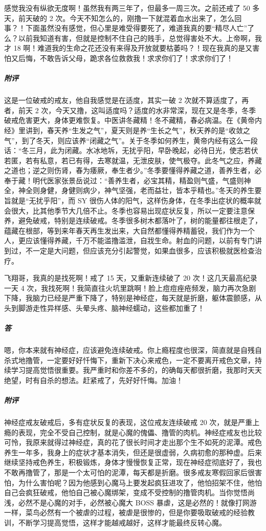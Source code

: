 \begin{case}
    感觉我没有纵欲无度啊！虽然我有两三年了，但最多一周三次。之前还戒了 50 多天，前天破的 2 次。今天不知怎么的，刚撸一下就混着血水出来了，怎么回事？！下面虽然没有感觉，但心里是难受得要死了，难道我真的要“精尽人亡”了么？以前我知道有害，但就是控制不住自己的贱手，总觉得害处不大。上帝啊，我才 18 啊！难道我的生命之花还没有来得及开放就要枯萎吗？！现在我真的是又害怕又后悔，不敢告诉父母，跪求各位救救我！求求你们了！求求你们了！
    \subparagraph{附评} 这是一位破戒的戒友，他自我感觉是在适度，其实一破 2 次就不算适度了，再者，前天 2 次，今天又撸，这叫适度吗？适度的水非常深，现在又是冬季，冬季破戒危害更大，身体更难恢复。中医讲冬藏精！冬不藏精，春必病温。在《黄帝内经》里讲到，春天养“生发之气”，夏天则是养“生长之气”，秋天养的是“收敛之气”，到了冬天，则应该养“闭藏之气”。关于冬季如何养生，黄帝内经有这么一段话：“冬三月，此为闭藏。水冰地坼，无扰乎阳，早卧晚起，必待日光，使志若伏若匿，若有私意，若已有得，去寒就温，无泄皮肤，使气极夺。此冬气之应，养藏之道也；逆之则伤肾，春为痿厥，奉生者少。”冬季要懂得养藏之道，善养生者，必奉于藏！明代医家张景岳说过：“善养生者，必宝其精，精盈则气盛，气盛则神全，神全则身健，身健则病少，神气坚强，老而益壮，皆本乎精也。”冬天的养生要旨就是“无扰乎阳”，而 SY 很伤人体的阳气，这样伤身体，在冬季出症状的概率就会很大，比其他季节大几倍不止。冬季也容易出现症状反复，所以一定要注意保养，避免破戒，特别是连续破戒。冬季很多树木都落叶了，树的能量都往根走了，蕴藏在根部，等到来年春天再生发出来，大自然都懂得养精蓄锐，我们作为一个人，更应该懂得养藏，千万不能滥撸滥泄，自戕生命。射血的问题，以前有专门讲到过，不一定是大问题，但应该充分引起警觉，如果血很多，应该积极就医检查治疗。
\end{case}

\begin{case}
    飞翔哥，我真的是找死啊！戒了 15 天，又重新连续破了 20 次！这几天最高纪录一天 4 次，我找死啊！我简直往火坑里跳啊！脸上痘痘痤疮频发，脑力再次急剧下降，我脑力已经是严重下降了，特别是神经症，每天就是折磨，躯体震颤感，从头到脚游走性异样感、头晕头疼、脑神经蠕动，这些都加重了！
    \subparagraph{答} 嗯，你本来就有神经症，应该避免连续破戒。你上瘾程度也很深，简直就是自残自杀式地撸管，一定要好好忏悔下，重新下决心来戒色，一定不要离开戒色文章，持续学习提高觉悟很重要。我严重时和你差不多的，的确每天都很折磨，我那时天天绝望，时有自杀的想法。赶紧戒了，先好好忏悔。加油！
    \subparagraph{附评} 神经症戒友破戒后，多有症状反复的表现，这位戒友连续破戒 20 次，就是严重上瘾的表现，完全不受自己控制，就是心魔的傀儡、撸管的肉机。神经症戒友也比较可怜，我原来就得过神经症，真的花了很长时间才走出那个生不如死的泥潭。戒色养生一年多，我身上的症状才基本消失，但还是很虚弱，久病初愈的那种虚。后来继续坚持戒色养生，积极锻炼，身体才慢慢恢复正常，现在神经症彻底好了，我也不敢再撸管了，那是一个太可怕的泥潭，每天都是折磨。很多戒友寒假回家后很害怕，为什么害怕呢？因为他感到心魔马上要发起疯狂进攻了，他怕招架不住，他怕自己会疯狂破戒，他怕自己被心魔绑架，变成不受控制的撸管肉机。当你觉悟尚浅，必然不是心魔的对手，必然被心魔大 BOSS 暴虐，这是必然的！就像打网游一样，菜鸟必然有一个被虐的过程，被虐是很惨的，但是你要吸取破戒的经验教训，不断学习提高觉悟，这样才能越戒越好，这样才能最终反转心魔。
\end{case}


